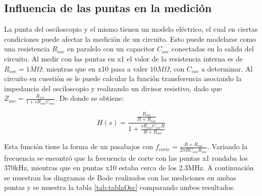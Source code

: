 \subsection{Influencia de las puntas en la medición}

La punta del osciloscopio y el mismo tienen un modelo eléctrico, el cual en ciertas condiciones puede afectar la medición de un circuito. Esto puede modelarse como una resistencia $R_{osc}$ en paralelo con un capacitor $C_{osc}$ conectadas en la salida del circuito.
Al medir con las puntas en x1 el valor de la resistencia interna es de $R_{osc}=1M\Omega$; mientras que en x10 pasa a valer $10M\Omega$, con $C_{osc}$ a determinar.
Al circuito en cuestión se le puede calcular la función transferencia asociando la impedancia del osciloscopio y realizando un divisor resistivo, dado que $Z_{osc}=\frac{R_{osc}}{1+s R_{osc} C_{osc}}$. De donde se obtiene:

\begin{center}
\begin{equation}
\label{eq:transfOsc}
H(s)=\frac{\frac{R_{osc}}{R+R_{osc}}}{1+\frac{s R_{osc} C_{osc} R}{R+R_{osc}}}
\end{equation}
\end{center}

Esta función tiene la forma de un pasabajos con $f_{corte}=\frac{R+R_{osc}}{2\pi R C_{osc} R_{osc}}$. Variando la frecuencia se encontró que la frecuencia de corte con las puntas x1 rondaba los 370kHz, mientras que en puntas x10 estaba cerca de los 2.3MHz.
A continuación se muestran los diagramas de Bode realizados con las mediciones en ambas puntas y se muestra la tabla \ref{tab:tablaOsc} comparando ambos resultados.

